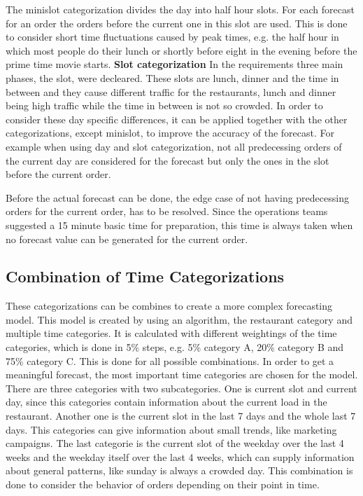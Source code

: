 The minislot categorization divides the day into half hour slots. For each forecast for an order the orders before the current one in this slot are used. This is done to consider short time fluctuations caused by peak times, e.g. the half hour in which most people do their lunch or shortly before eight in the evening before the prime time movie starts.
\newline\textbf{Slot categorization}\newline
In the requirements three main phases, the slot, were decleared. These slots are lunch, dinner and the time in between and they cause different traffic for the restaurants, lunch and dinner being high traffic while the time in between is not so crowded. In order to consider these day specific differences, it can be applied together with the other categorizations, except minislot, to improve the accuracy of the forecast. For example when using day and slot categorization, not all predecessing orders of the current day are considered for the forecast but only the ones in the slot before the current order.

\newline
Before the actual forecast can be done, the edge case of not having predecessing orders for the current order, has to be resolved. Since the operations teams suggested a 15 minute basic time for preparation, this time is always taken when no forecast value can be generated for the current order.
\subsection{Combination of Time Categorizations}\label{subsection:Categorizing by Order}
These categorizations can be combines to create a more complex forecasting model. This model is created by using an algorithm, the restaurant category and multiple time categories. It is calculated with different weightings of the time categories, which is done in 5\% steps, e.g. 5\% category A, 20\% category B and 75\% category C. This is done for all possible combinations. In order to get a meaningful forecast, the most important time categories are chosen for the model. There are three categories with two subcategories. One is current slot and current day, since this categories contain information about the current load in the restaurant. Another one is the current slot in the last 7 days and the whole last 7 days. This categories can give information about small trends, like marketing campaigns. The last categorie is the current slot of the weekday over the last 4 weeks and the weekday itself over the last 4 weeks, which can supply information about general patterns, like sunday is always a crowded day.\newline
This combination is done to consider the behavior of orders depending on their point in time.
